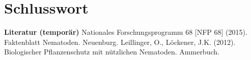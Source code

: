 \newpage
\section{Schlusswort}

\textbf{Literatur (temporär)}
\newline
Nationales Forschungsprogramm 68 [NFP 68] (2015). Faktenblatt Nematoden. Neuenburg.
\newline
\newline
Leillinger, O., Löckener, J.K. (2012). Biologischer Pflanzenschutz mit nützlichen Nematoden. Ammerbuch. 

